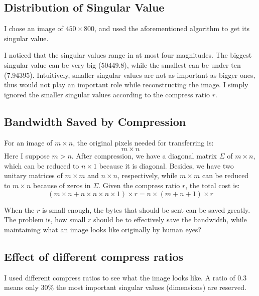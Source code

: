 \documentclass{article}
\begin{document}
        \subsection{Distribution of Singular Value}
            \par
            I chose an image of $450 \times 800$,
            and used the aforementioned algorithm to get its singular value.
            \par
            I noticed that the singular values range in at most four magnitudes.
            The biggest singular value can be very big (50449.8),
            while the smallest can be under ten (7.94395).
            Intuitively, smaller singular values are not as important as bigger ones,
            thus would not play an important role while reconstructing the image.
            I simply ignored the smaller singular values according to the compress ratio $r$.

        \subsection{Bandwidth Saved by Compression}
            \par
            For an image of $m \times n$,
            the original pixels needed for transferring is: $$m \times n$$
            Here I suppose $m > n$.
            After compression, we have a diagonal matrix $\Sigma$ of $m \times n$,
            which can be reduced to $n \times 1$ because it is diagonal.
            Besides, we have two unitary matrices of $m \times m$ and $n \times n$, respectively,
            while $m \times m$ can be reduced to $m \times n$ because of zeros in $\Sigma$.
            Given the compress ratio $r$,
            the total cost is:
            $$(m \times n + n \times n \times n \times 1) \times r = n \times (m + n + 1) \times r$$
            \par
            When the $r$ is small enough, the bytes that should be sent can be saved greatly.
            The problem is, how small $r$ should be to effectively save the bandwidth,
            while maintaining what an image looks like originally by human eyes?

        \subsection{Effect of different compress ratios}
            \par
            I used different compress ratios to see what the image looks like.
            A ratio of 0.3 means only 30\%
            the most important singular values (dimensions) are reserved.
\end{document}
